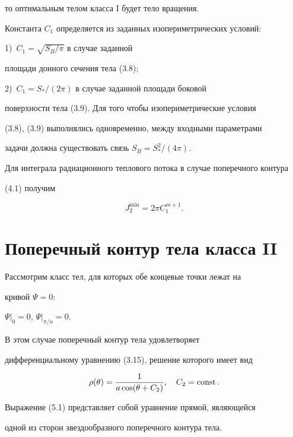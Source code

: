 то оптимальным телом класса I будет тело вращения.


Константа $C_1$ определяется из заданных изопериметрических условий:


1)~$C_1 = \sqrt { S_B / \pi }$ в случае заданной


площади донного сечения тела (3.8);


2)~$C_1 = S_* / (2 \pi)$ в случае заданной площади боковой


поверхности тела (3.9). Для того чтобы изопериметрические условия


(3.8), (3.9) выполнялись одновременно, между входными параметрами


задачи должна существовать связь $S_B = S_*^2/ (4\pi)$.





Для интеграла радиационного теплового потока в случае поперечного контура


(4.1) получим


$$


J_2^{\min} = 2 \pi C_1^{m+1}.


$$





\section{Поперечный контур тела класса II}





Рассмотрим класс тел, для которых обе концевые точки лежат на


кривой $\Psi = 0$:


$\Psi |_0 = 0$, $\Psi |_{\pi / n} = 0$.


В этом случае поперечный контур тела удовлетворяет


дифференциальному уравнению (3.15), решение которого имеет вид


\begin{equation}


\rho (\theta) = \frac {1} {a \cos (\theta+C_2)}, \quad


C_2 = \const.


\end{equation}


Выражение (5.1) представляет собой уравнение прямой, являющейся


одной из сторон звездообразного поперечного контура тела.


